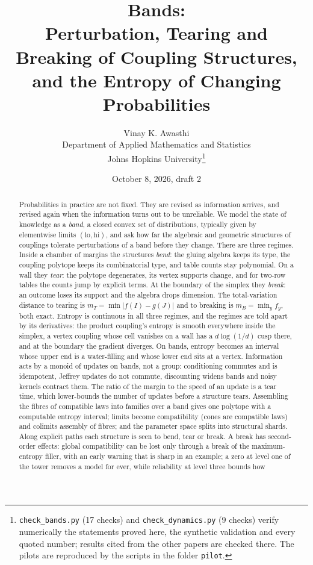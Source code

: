 \documentclass[11pt]{article}
\title{Bands:\\
Perturbation, Tearing and Breaking of Coupling Structures,\\ and the Entropy of Changing Probabilities}
\author{Vinay K. Awasthi\\
Department of Applied Mathematics and Statistics\\
Johns Hopkins University\thanks{\texttt{check\_bands.py} (17 checks) and \texttt{check\_dynamics.py} (9 checks) verify numerically the statements proved here, the synthetic
validation and every quoted number; results cited from the other papers are checked there. The pilots are reproduced by the
scripts in the folder \texttt{pilot}.}}
\date{October 8, 2026, draft 2}
\theoremstyle{definition}
\theoremstyle{remark}
\begin{document}
\maketitle

\begin{abstract}
Probabilities in practice are not fixed. They are revised as information arrives, and revised again when the information
turns out to be unreliable. We model the state of knowledge as a \emph{band}, a closed convex set of distributions, typically
given by elementwise limits $(\mathrm{lo},\mathrm{hi})$, and ask how far the algebraic and geometric structures of couplings
tolerate perturbations of a band before they change. There are three regimes. Inside a chamber of margins the structures
\emph{bend}: the gluing algebra keeps its type, the coupling polytope keeps its combinatorial type, and table counts stay
polynomial. On a wall they \emph{tear}: the polytope degenerates, its vertex supports change, and for two-row tables the
counts jump by explicit terms. At the boundary of the
simplex they \emph{break}: an outcome loses its support and the algebra drops dimension. The total-variation distance to
tearing is $m_T=\min\lvert f(I)-g(J)\rvert$ and to breaking is $m_B=\min_y f_y$, both exact. Entropy is continuous in all three
regimes, and the regimes are told apart by its derivatives: the product coupling's entropy is smooth everywhere inside
the simplex, a vertex coupling whose cell vanishes on a wall has a $d\log(1/d)$ cusp there, and at the boundary the gradient
diverges. On bands, entropy becomes an interval whose upper end is a water-filling and whose lower end sits at a vertex.
Information acts by a monoid of updates on bands, not a group: conditioning commutes and is idempotent, Jeffrey updates do not
commute, discounting widens bands and noisy kernels contract them. The ratio of the margin to the speed of an update is a
tear time, which lower-bounds the number of updates before a structure tears. Assembling the fibres of compatible laws into families
over a band gives one polytope with a computable entropy interval; limits become compatibility (cones are compatible laws) and colimits
assembly of fibres; and the
parameter space splits into structural shards. Along explicit paths each structure is seen to bend, tear or break. A break has
second-order effects: global compatibility can be lost only through a break of the maximum-entropy filler, with an early warning
that is sharp in an example; a zero at level one of the tower removes a model for ever, while reliability at level three bounds how

\end{abstract}
\end{document}

